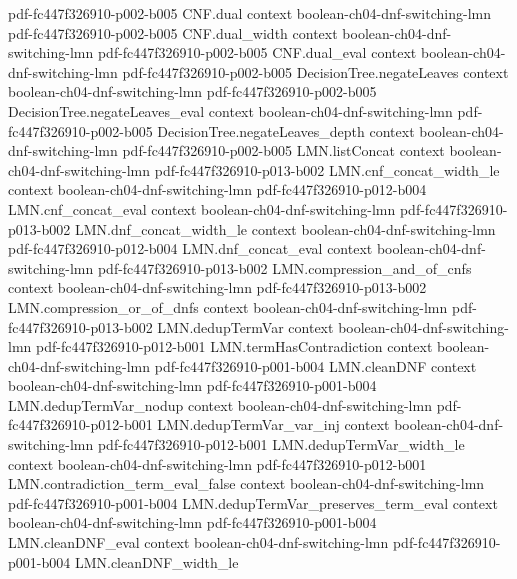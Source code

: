 \begin{lemma}
  {pdf-fc447f326910-p002-b005}
\proofstep
  {CNF.dual}
  {context}
  {boolean-ch04-dnf-switching-lmn}
  {pdf-fc447f326910-p002-b005}
\proofstep
  {CNF.dual_width}
  {context}
  {boolean-ch04-dnf-switching-lmn}
  {pdf-fc447f326910-p002-b005}
\proofstep
  {CNF.dual_eval}
  {context}
  {boolean-ch04-dnf-switching-lmn}
  {pdf-fc447f326910-p002-b005}
\proofstep
  {DecisionTree.negateLeaves}
  {context}
  {boolean-ch04-dnf-switching-lmn}
  {pdf-fc447f326910-p002-b005}
\proofstep
  {DecisionTree.negateLeaves_eval}
  {context}
  {boolean-ch04-dnf-switching-lmn}
  {pdf-fc447f326910-p002-b005}
\proofstep
  {DecisionTree.negateLeaves_depth}
  {context}
  {boolean-ch04-dnf-switching-lmn}
  {pdf-fc447f326910-p002-b005}
\proofstep
  {LMN.listConcat}
  {context}
  {boolean-ch04-dnf-switching-lmn}
  {pdf-fc447f326910-p013-b002}
\proofstep
  {LMN.cnf_concat_width_le}
  {context}
  {boolean-ch04-dnf-switching-lmn}
  {pdf-fc447f326910-p012-b004}
\proofstep
  {LMN.cnf_concat_eval}
  {context}
  {boolean-ch04-dnf-switching-lmn}
  {pdf-fc447f326910-p013-b002}
\proofstep
  {LMN.dnf_concat_width_le}
  {context}
  {boolean-ch04-dnf-switching-lmn}
  {pdf-fc447f326910-p012-b004}
\proofstep
  {LMN.dnf_concat_eval}
  {context}
  {boolean-ch04-dnf-switching-lmn}
  {pdf-fc447f326910-p013-b002}
\proofstep
  {LMN.compression_and_of_cnfs}
  {context}
  {boolean-ch04-dnf-switching-lmn}
  {pdf-fc447f326910-p013-b002}
\proofstep
  {LMN.compression_or_of_dnfs}
  {context}
  {boolean-ch04-dnf-switching-lmn}
  {pdf-fc447f326910-p013-b002}
\proofstep
  {LMN.dedupTermVar}
  {context}
  {boolean-ch04-dnf-switching-lmn}
  {pdf-fc447f326910-p012-b001}
\proofstep
  {LMN.termHasContradiction}
  {context}
  {boolean-ch04-dnf-switching-lmn}
  {pdf-fc447f326910-p001-b004}
\proofstep
  {LMN.cleanDNF}
  {context}
  {boolean-ch04-dnf-switching-lmn}
  {pdf-fc447f326910-p001-b004}
\proofstep
  {LMN.dedupTermVar_nodup}
  {context}
  {boolean-ch04-dnf-switching-lmn}
  {pdf-fc447f326910-p012-b001}
\proofstep
  {LMN.dedupTermVar_var_inj}
  {context}
  {boolean-ch04-dnf-switching-lmn}
  {pdf-fc447f326910-p012-b001}
\proofstep
  {LMN.dedupTermVar_width_le}
  {context}
  {boolean-ch04-dnf-switching-lmn}
  {pdf-fc447f326910-p012-b001}
\proofstep
  {LMN.contradiction_term_eval_false}
  {context}
  {boolean-ch04-dnf-switching-lmn}
  {pdf-fc447f326910-p001-b004}
\proofstep
  {LMN.dedupTermVar_preserves_term_eval}
  {context}
  {boolean-ch04-dnf-switching-lmn}
  {pdf-fc447f326910-p001-b004}
\proofstep
  {LMN.cleanDNF_eval}
  {context}
  {boolean-ch04-dnf-switching-lmn}
  {pdf-fc447f326910-p001-b004}
\proofstep
  {LMN.cleanDNF_width_le}

\end{lemma}
